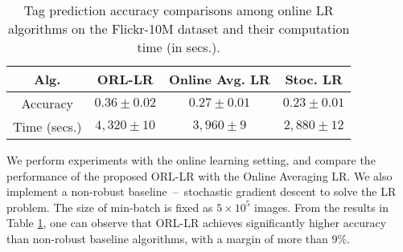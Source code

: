 \documentclass[11pt]{article}
\begin{document}
\begin{table}
	\caption{Tag prediction accuracy comparisons among online LR algorithms  on the Flickr-10M dataset and their computation time (in secs.).}
	\label{tab:flickr-acc_orl}
	\centering
	\begin{tabular}{c|c|c|c}
		Alg. &  ORL-LR & Online Avg. LR & Stoc. LR\\
		\hline
		Accuracy  & $ \mathbf{0.36 \pm 0.02} $ & $ 0.27 \pm 0.01 $ & $ 0.23 \pm 0.01 $  \\
		\hline
		Time (secs.)  &$ 4{,}320 \pm 10 $  & $ 3{,}960 \pm 9 $  & $ 2{,}880 \pm 12 $ \\
	\end{tabular}
\end{table}




We  perform experiments with the online learning setting, and compare the performance of the proposed ORL-LR with the Online Averaging LR. We also implement a non-robust baseline~--~stochastic gradient descent to solve the LR problem. The size of min-batch is fixed as $ 5\times 10^5 $ images. From the results in Table \ref{tab:flickr-acc_orl}, one can observe that ORL-LR achieves significantly higher accuracy than  non-robust baseline algorithms, with a margin of more than $ 9\% $. 
\end{document}

